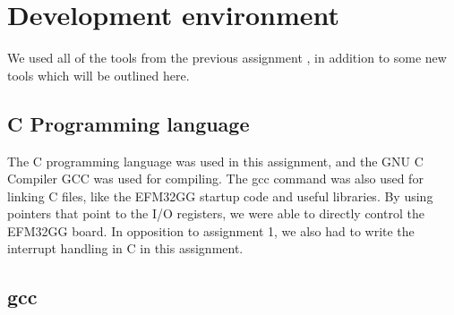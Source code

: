\section{Development environment}
We used all of the tools from the previous assignment \cite{report-1}, in addition to some new tools which will be outlined here.

\subsection{C Programming language}
The C programming language was used in this assignment, and the GNU C Compiler GCC was used for compiling.
The gcc command was also used for linking C files, like the EFM32GG startup code and useful libraries. By using pointers that point to the I/O registers, we were able to directly control the EFM32GG board. In opposition to assignment 1, we also had to write the interrupt handling in C in this assignment.

\subsection{gcc}
